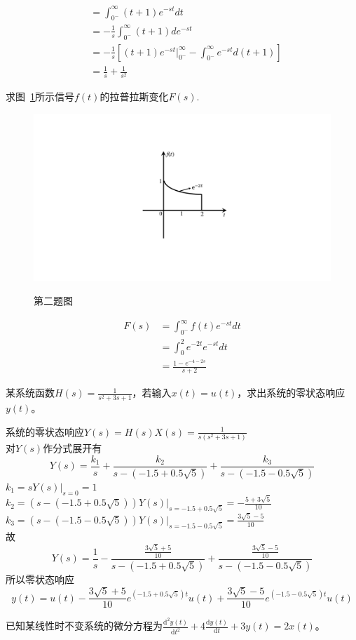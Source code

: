 \documentclass[answers]{exam}  %
\begin{document}
\begin{questions}
\begin{solution}
\begin{align*}
		&=\int_{0^-}^{\infty}(t+1)e^{-st}dt\\
		&=-\frac{1}{s}\int_{0^-}^\infty(t+1)de^{-st}\\
		&=-\frac{1}{s}[(t+1)e^{-st}|_{0^-}^\infty-\int_{0^-}^\infty e^{-st}d(t+1)]\\
		&=\frac{1}{s}+\frac{1}{s^2}
	\end{align*}
\end{solution}
\newpage
\question 求图~\ref{Figure:question_2}所示信号$f(t)$的拉普拉斯变化$F(s)$.
\begin{figure}[!h]
	\centering
	\includegraphics[width=0.3\linewidth]{pics/question_2.pdf}
	\label{Figure:question_2}
	\caption{第二题图}
\end{figure}
\begin{solution}
	\begin{align*}
		F(s)&=\int_{0^-}^\infty f(t)e^{-st}dt\\
		&=\int_0^2 e^{-2t}e^{-st}dt\\
		&=\frac{1-e^{-4-2s}}{s+2}
	\end{align*}
\end{solution}
\newpage
\question 某系统函数$H(s)=\frac{1}{s^2+3s+1}$，若输入$x(t)=u(t)$，求出系统的零状态响应$y(t)$。
\begin{solution}
系统的零状态响应$Y(s)=H(s)X(s)=\frac{1}{s(s^2+3s+1)}$\\
对$Y(s)$作分式展开有$$Y(s)=\frac{k_1}{s}+\frac{k_2}{s-(-1.5+0.5\sqrt{5})}+\frac{k_3}{s-(-1.5-0.5\sqrt{5})}$$
$k_1=sY(s)|_{s=0}=1$\\
$k_2=(s-(-1.5+0.5\sqrt{5}))Y(s)|_{s=-1.5+0.5\sqrt{5}}=-\frac{5+3\sqrt{5}}{10}$\\
$k_3=(s-(-1.5-0.5\sqrt{5}))Y(s)|_{s=-1.5-0.5\sqrt{5}}=\frac{3\sqrt{5}-5}{10}$\\
故$$Y(s)=\frac{1}{s}-\frac{\frac{3\sqrt{5}+5}{10}}{s-(-1.5+0.5\sqrt{5})}+\frac{\frac{3\sqrt{5}-5}{10}}{s-(-1.5-0.5\sqrt{5})}$$
所以零状态响应$$y(t)=u(t)-\frac{3\sqrt{5}+5}{10}e^{(-1.5+0.5\sqrt{5})t}u(t)+\frac{3\sqrt{5}-5}{10}e^{(-1.5-0.5\sqrt{5})t}u(t)$$
\end{solution}
\newpage
\question 已知某线性时不变系统的微分方程为$\frac{\mathrm{d}^2y(t)}{\mathrm{d}t^2}+4\frac{\mathrm{d}y(t)}{\mathrm{d}t}+3y(t)=2x(t)$。
\begin{enumerate}[(1)]

\end{enumerate}
\end{questions}
\end{document}
